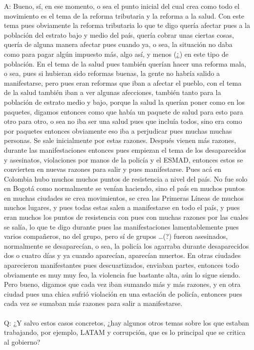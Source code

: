 \documentclass{phyasgn}\usepackage{nag}
\begin{document}
A: Bueno, sí, en ese momento, o sea el punto inicial del cual crea como todo el movimiento es el tema de la reforma tributaria y la reforma a la salud. Con este tema pues obviamente la reforma tributaria lo que te digo quería afectar pues a la población del estrato bajo y medio del país, quería cobrar unas ciertas cosas, quería de alguna manera afectar pues cuando ya, o sea, la situación no daba como para pagar algún impuesto más, algo así, y menos (¿) en este tipo de población. En el tema de la salud pues también querían hacer una reforma mala, o sea, pues si hubieran sido reformas buenas, la gente no habría salido a manifestarse, pero pues eran reformas que iban a afectar el pueblo, con el tema de la salud también iban a ver algunas afecciones, también tanto para la población de estrato medio y bajo, porque la salud la querían poner como en los paquetes, digamos entonces como que había un paquete de salud para esto para otro para otro, o sea no iba ser una salud pues que incluía todos, sino era como por paquetes entonces obviamente eso iba a perjudicar pues muchas muchas personas. Se sale inicialmente por estas razones. Después vienen más razones, durante las manifestaciones entonces pues empiezan el tema de los desaparecidos y asesinatos, violaciones por manos de la policía y el ESMAD, entonces estos se convierten en nuevas razones para salir y pues manifestarse. Pues acá en Colombia hubo muchos muchos puntos de resistencia a nivel del país. No fue solo en Bogotá como normalmente se venían haciendo, sino el país en muchos puntos en muchas ciudades se crea movimientos, se crea las Primeras Líneas de muchos muchos lugares, y pues todas estas salen a manifestarse en todo el país, y pues eran muchos los puntos de resistencia con pues con muchas razones por las cuales se salía, lo que te digo durante pues las manifestaciones lamentablemente pues varios compañeros, no del grupo, pero sí de grupos …(?) fueron asesinados, normalmente se desaparecían, o sea, la policía los agarraba durante desaparecidos dos o cuatro días y ya cuando aparecían, aparecían muertos. En otras ciudades aparecieron manifestantes pues descuartizados, enviaban partes, entonces todo obviamente es muy muy feo, la violencia fue bastante alta, aún lo sigue siendo. Pero bueno, digamos que cada vez iban sumando más y más razones, y en otra ciudad pues una chica sufrió violación en una estación de policía, entonces pues cada vez se sumaban más razones para salir a manifestarse.\\
\\
Q: ¿Y salvo estos casos concretos, ¿hay algunos otros temas sobre los que estaban trabajando, por ejemplo, LATAM y corrupción, que es lo principal que se critica al gobierno? \\
\end{document}
